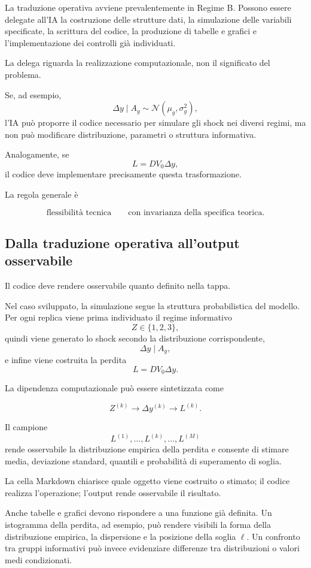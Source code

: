 La traduzione operativa avviene prevalentemente in Regime B. Possono essere
delegate all'IA la costruzione delle strutture dati, la simulazione delle
variabili specificate, la scrittura del codice, la produzione di tabelle e
grafici e l'implementazione dei controlli gi\`{a} individuati.

La delega riguarda la realizzazione computazionale, non il significato del
problema.

Se, ad esempio,
\[
\Delta y\mid A_g
\sim
\mathcal{N}(\mu_g,\sigma_g^2),
\]
l'IA pu\`{o} proporre il codice necessario per simulare gli shock nei diversi
regimi, ma non pu\`{o} modificare distribuzione, parametri o struttura
informativa.

Analogamente, se
\[
L=D V_0\Delta y,
\]
il codice deve implementare precisamente questa trasformazione.

La regola generale \`{e}

\[
\boxed{
\text{flessibilit\`{a} tecnica}
\qquad
\text{con invarianza della specifica teorica}.
}
\]

\subsection{Dalla traduzione operativa all'output osservabile}

Il codice deve rendere osservabile quanto definito nella tappa.

Nel caso sviluppato, la simulazione segue la struttura probabilistica del
modello. Per ogni replica viene prima individuato il regime informativo
\[
Z\in\{1,2,3\},
\]
quindi viene generato lo shock secondo la distribuzione corrispondente,
\[
\Delta y\mid A_g,
\]
e infine viene costruita la perdita
\[
L=D V_0\Delta y.
\]

La dipendenza computazionale pu\`{o} essere sintetizzata come

\[
Z^{(k)}
\longrightarrow
\Delta y^{(k)}
\longrightarrow
L^{(k)}.
\]

Il campione
\[
L^{(1)},\ldots,L^{(k)},\ldots,L^{(M)}
\]
rende osservabile la distribuzione empirica della perdita e consente di
stimare media, deviazione standard, quantili e probabilit\`{a} di superamento
di soglia.

La cella Markdown chiarisce quale oggetto viene costruito o stimato; il codice
realizza l'operazione; l'output rende osservabile il risultato.

Anche tabelle e grafici devono rispondere a una funzione gi\`{a} definita.
Un istogramma della perdita, ad esempio, pu\`{o} rendere visibili la forma
della distribuzione empirica, la dispersione e la posizione della soglia
$\ell$. Un confronto tra gruppi informativi pu\`{o} invece evidenziare
differenze tra distribuzioni o valori medi condizionati.

